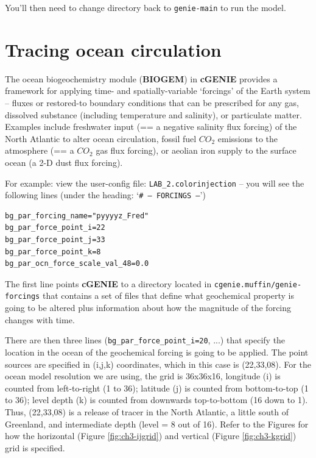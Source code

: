 \documentclass[11pt,fleqn]{book} %
\begin{document}
You’ll then need to change directory back to \texttt{genie-main} to run the model.


\newpage


\section{Tracing ocean circulation}

The ocean biogeochemistry module (\textbf{BIOGEM}) in \textbf{cGENIE} provides a framework for applying time- and spatially-variable ‘forcings’ of the Earth system – fluxes or restored-to boundary conditions that can be prescribed for any gas, dissolved substance (including temperature and salinity), or particulate matter. Examples include freshwater input (== a negative salinity flux forcing) of the North Atlantic to alter ocean circulation, fossil fuel \(CO_{2}\) emissions to the atmosphere (== a \(CO_{2}\) gas flux forcing), or aeolian iron supply to the surface ocean (a 2-D dust flux forcing).

For example: view the user-config file: \texttt{LAB\_2.colorinjection} – you will see the following lines (under the heading: ‘\texttt{\# --- FORCINGS ---}’)

\begin{verbatim}
bg_par_forcing_name="pyyyyz_Fred"
bg_par_force_point_i=22
bg_par_force_point_j=33
bg_par_force_point_k=8
bg_par_ocn_force_scale_val_48=0.0
\end{verbatim}

The first line points \textbf{cGENIE} to a directory located in \texttt{cgenie.muffin/genie-forcings} that contains a set of files that define what geochemical property is going to be altered plus information about how the magnitude of the forcing changes with time.

There are then three lines (\texttt{bg\_par\_force\_point\_i=20}, ...) that specify the location in the ocean of the geochemical forcing is going to be applied. The point sources are specified in (i,j,k) coordinates, which in this case is (22,33,08). For the ocean model resolution we are using, the grid is 36x36x16, longitude (i) is counted from left-to-right (1 to 36); latitude (j) is counted from bottom-to-top (1 to 36); level depth (k) is counted from downwards top-to-bottom (16 down to 1). Thus, (22,33,08) is a release of tracer in the North Atlantic, a little south of Greenland, and intermediate depth (level = 8 out of 16). Refer to the Figures for how the horizontal (Figure \ref{fig:ch3-ijgrid}) and vertical (Figure \ref{fig:ch3-kgrid}) grid is specified.
\end{document}
